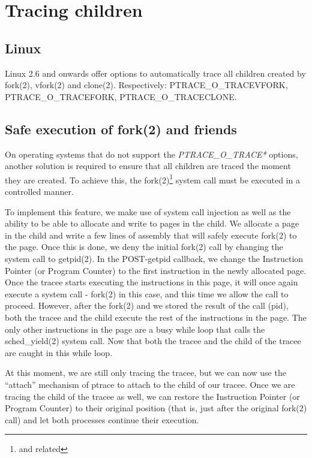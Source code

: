 \documentclass[a4paper, twoside, 10pt, twocolumn]{report}
\begin{document}

\section{Tracing children}

\subsection{Linux}

Linux 2.6 and onwards offer options to automatically trace all children
created by fork(2), vfork(2) and clone(2). Respectively:
PTRACE\_O\_TRACEVFORK, PTRACE\_O\_TRACEFORK, PTRACE\_O\_TRACECLONE.



\subsection{Safe execution of fork(2) and friends}

On operating systems that do not support the \textit{PTRACE\_O\_TRACE*} options,
another solution is required to ensure that all children are traced the moment
they are created. To achieve this, the fork(2)\footnote{and related} system call
must be executed in a controlled manner.

To implement this feature, we make use of system call injection as well as the
ability to be able to allocate and write to pages in the child. We allocate a
page in the child and write a few lines of assembly that will safely execute
fork(2) to the page. Once this is done, we deny the initial fork(2) call by
changing the system call to getpid(2). In the POST-getpid callback, we change
the Instruction Pointer (or Program Counter) to the first instruction in the
newly allocated page. Once the tracee starts executing the instructions in this
page, it will once again execute a system call - fork(2) in this case, and this
time we allow the call to proceed. However, after the fork(2) and we stored the
result of the call (pid), both the tracee and the child execute the rest of the
instructions in the page. The only other instructions in the page are a busy
while loop that calls the sched\_yield(2) system call. Now that both the tracee
and the child of the tracee are caught in this while loop.

At this moment, we are still only tracing the tracee, but we can now use the
``attach'' mechanism of ptrace to attach to the child of our tracee. Once we are
tracing the child of the tracee as well, we can restore the Instruction Pointer
(or Program Counter) to their original position (that is, just after the
original fork(2) call) and let both processes continue their execution.
\end{document}
